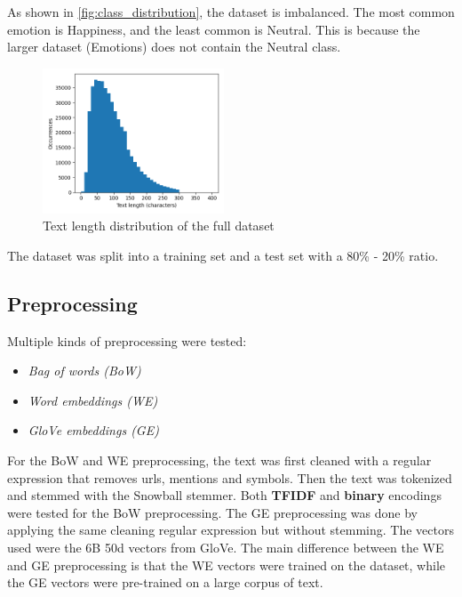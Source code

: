 As shown in \autoref{fig:class_distribution},
the dataset is imbalanced. The most common
emotion is Happiness, and the least common
is Neutral. This is because the larger dataset
(Emotions) does not contain the Neutral class.

\begin{figure}[H]
    \centering
    \includegraphics[width=0.48\textwidth]{images/length_distribution.png}
    \caption{Text length distribution of the full dataset}
    \label{fig:length_distribution}
\end{figure}

The dataset was split into a training set
and a test set with a 80\% - 20\% ratio.

\subsection{Preprocessing}
Multiple kinds of preprocessing were tested:
\begin{itemize}
    \item \textit{Bag of words (BoW)}
    \item \textit{Word embeddings (WE)}
    \item \textit{GloVe embeddings (GE)}
\end{itemize}
For the BoW and WE preprocessing, the text was
first cleaned with a regular expression that
removes urls, mentions and symbols. Then the
text was tokenized and stemmed with the 
Snowball stemmer. Both \textbf{TFIDF} and 
\textbf{binary} encodings were tested for
the BoW preprocessing.
The GE preprocessing was done by applying 
the same cleaning regular
expression but without stemming. The vectors
used were the 6B 50d vectors from
GloVe\cite{glove}.
The main difference between the WE and GE
preprocessing is that the WE vectors were
trained on the dataset, while the GE vectors
were pre-trained on a large corpus of text.
